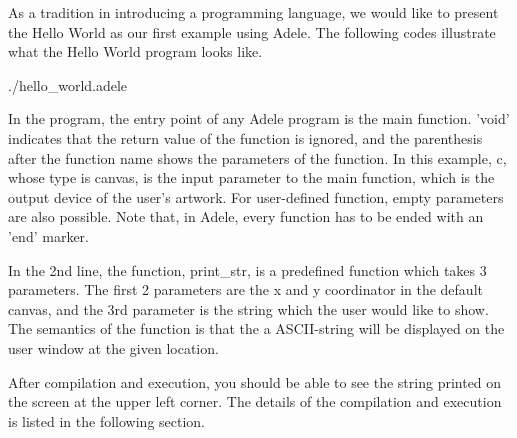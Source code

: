\documentclass[11pt,letterpaper]{article}
\begin{document}
As a tradition in introducing a programming language, we would like to present the Hello World as our first example using Adele. The following codes illustrate what the Hello World program looks like.

 {./hello_world.adele}

In the program, the entry point of any Adele program is the main function. 'void' indicates that the return value of the function is ignored, and the parenthesis after the function name shows the parameters of the function. In this example, c, whose type is canvas, is the input parameter to the main function, which is the output device of the user's artwork. For user-defined function, empty parameters are also possible. Note that, in Adele, every function has to be ended with an 'end' marker.

In the 2nd line, the function, print\_str, is a predefined function which takes 3 parameters. The first 2 parameters are the x and y coordinator in the default canvas, and the 3rd parameter is the string which the user would like to show. The semantics of the function is that the a ASCII-string will be displayed on the user window at the given location.

After compilation and execution, you should be able to see the string printed on the screen at the upper left corner. The details of the compilation and execution is listed in the following section.
\end{document}

